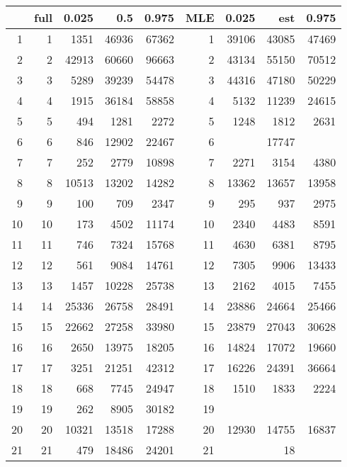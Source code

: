 \documentclass{article}
\begin{document}

\begin{table}[ht]
\centering
\begin{tabular}{rrrrrrrrr}
  
  \hline
 & full & 0.025 & 0.5 & 0.975 & MLE & 0.025 & est & 0.975 \\ 
  \hline
1 & 1 & 1351 & 46936 & 67362 &  1 & 39106 & 43085 & 47469 \\           
  2 & 2 & 42913 & 60660 & 96663 &  2 & 43134 & 55150 & 70512 \\ 
  3 & 3 & 5289 & 39239 & 54478 & 3 & 44316 & 47180 & 50229 \\ 
  4 & 4 & 1915 & 36184 & 58858 & 4 & 5132 & 11239 & 24615 \\ 
  5 & 5 & 494 & 1281 & 2272 &  5 & 1248 & 1812 & 2631 \\ 
  6 & 6 & 846 & 12902 & 22467 &  6 &  & 17747 &  \\ 
  7 & 7 & 252 & 2779 & 10898 & 7 & 2271 & 3154 & 4380 \\ 
  8 & 8 & 10513 & 13202 & 14282 &  8 & 13362 & 13657 & 13958 \\ 
  9 & 9 & 100 & 709 & 2347 & 9 & 295 & 937 & 2975 \\ 
  10 & 10 & 173 & 4502 & 11174 & 10 & 2340 & 4483 & 8591 \\ 
  11 & 11 & 746 & 7324 & 15768 &  11 & 4630 & 6381 & 8795 \\     
  12 & 12 & 561 & 9084 & 14761 &  12 & 7305 & 9906 & 13433 \\    
  13 & 13 & 1457 & 10228 & 25738  & 13 & 2162 & 4015 & 7455 \\ 
  14 & 14 & 25336 & 26758 & 28491 &  14 & 23886 & 24664 & 25466 \\  
  15 & 15 & 22662 & 27258 & 33980 &  15 & 23879 & 27043 & 30628 \\ 
  16 & 16 & 2650 & 13975 & 18205  &   16 & 14824 & 17072 & 19660 \\ 
  17 & 17 & 3251 & 21251 & 42312 &  17 & 16226 & 24391 & 36664 \\ 
  18 & 18 & 668 & 7745 & 24947 &  18 & 1510 & 1833 & 2224 \\ 
  19 & 19 & 262 & 8905 & 30182 & 19 &  &  &  \\ 
  20 & 20 & 10321 & 13518 & 17288 &  20 & 12930 & 14755 & 16837 \\ 
  21 & 21 & 479 & 18486 & 24201 &  21 &  & 18 &  \\ 
   \hline
\end{tabular}
\end{table}
\end{document}
